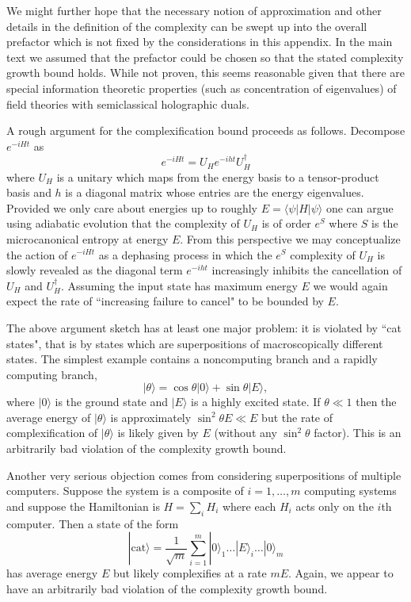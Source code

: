 \documentclass[12pt]{article}
\numberwithin{equation}{section}
\newcommand{\beq}{\begin{equation}}
\newcommand{\eeq}{\end{equation}}
\newcommand{\ket}[1]{| #1 \rangle }
\begin{document}
We might further hope that the necessary notion of approximation and other details in the definition of the complexity can be swept up into the overall prefactor which is not fixed by the considerations in this appendix. In the main text we assumed that the prefactor could be chosen so that the stated complexity growth bound holds. While not proven, this seems reasonable given that there are special information theoretic properties \cite{infocurvelength} (such as concentration of eigenvalues) of field theories with semiclassical holographic duals.

A rough argument for the complexification bound proceeds as follows. Decompose $e^{-i H t}$ as
\beq
e^{-i H t} = U_H e^{-i h t} U_H^\dagger
\eeq
where $U_H$ is a unitary which maps from the energy basis to a tensor-product basis and $h$ is a diagonal matrix whose entries are the energy eigenvalues. Provided we only care about energies up to roughly $E = \langle\psi| H|\psi \rangle$ one can argue using adiabatic evolution that the complexity of $U_H$ is of order $e^S$ where $S$ is the microcanonical entropy at energy $E$. From this perspective we may conceptualize the action of $e^{-iHt}$ as a dephasing process in which the $e^S$ complexity of $U_H$ is slowly revealed as the diagonal term $e^{-i h t}$ increasingly inhibits the cancellation of $U_H$ and $U_H^\dagger$. Assuming the input state has maximum energy $E$ we would again expect the rate of ``increasing failure to cancel" to be bounded by $E$.

The above argument sketch has at least one major problem: it is violated by ``cat states", that is by states which are superpositions of macroscopically different states. The simplest example contains a noncomputing branch and a rapidly computing branch,
\beq
\ket{\theta } = \cos \theta \ket{0} + \sin \theta \ket{E},
\eeq
where $\ket{0}$ is the ground state and $\ket{E}$ is a highly excited state. If $\theta \ll 1$ then the average energy of $\ket{\theta}$ is approximately $\sin^2 \theta E \ll E$ but the rate of complexification of $\ket{\theta}$ is likely given by $E$ (without any $\sin^2 \theta$ factor). This is an arbitrarily bad violation of the complexity growth bound.

Another very serious objection comes from considering superpositions of multiple computers. Suppose the system is a composite of $i=1,\dots,m$ computing systems and suppose the Hamiltonian is $H = \sum_i H_i$ where each $H_i$ acts only on the $i$th computer. Then a state of the form
\beq
\ket{\text{cat}} = \frac{1}{\sqrt{m}} \sum_{i=1}^m \ket{0}_1 \dots \ket{E}_i \dots \ket{0}_m
\eeq
has average energy $E$ but likely complexifies at a rate $m E$. Again, we appear to have an arbitrarily bad violation of the complexity growth bound.
\end{document}
